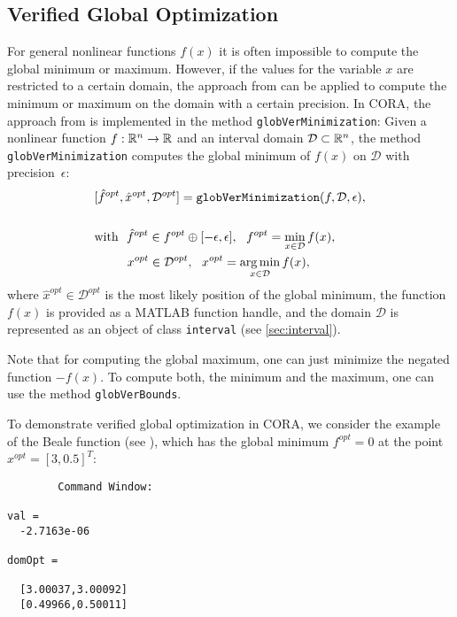\subsection{Verified Global Optimization}

For general nonlinear functions $f(x)$ it is often impossible to compute the global minimum or maximum. However, if the values for the variable $x$ are restricted to a certain domain, the approach from \cite{Makino2005} can be applied to compute the minimum or maximum on the domain with a certain precision. In CORA, the approach from \cite{Makino2005} is implemented in the method \texttt{globVerMinimization}: Given a nonlinear function $f: \mathbb{R}^n \to \mathbb{R}$ and an interval domain $\mathcal{D} \subset \mathbb{R}^n$, the method \texttt{globVerMinimization} computes the global minimum of $f(x)$ on $\mathcal{D}$ with precision~$\epsilon$:
\begin{align*}
	\begin{split}
	& [\hat{f}^{opt},\hat{x}^{opt},\mathcal{D}^{opt}] = \texttt{globVerMinimization}(f,\mathcal{D},\epsilon), \\
	& ~ \\
	& \text{with} ~~ \hat{f}^{opt} \in f^{opt} \oplus [-\epsilon,\epsilon], ~~f^{opt} =  \min_{x \in \mathcal{D}} f(x), \\
	& ~~~~~~~~ x^{opt} \in \mathcal{D}^{opt}, ~~ x^{opt} = \operatorname*{arg\,min}_{x \in \mathcal{D}} f(x),
	\end{split}
\end{align*}
where $\hat{x}^{opt} \in \mathcal{D}^{opt}$ is the most likely position of the global minimum, the function $f(x)$ is provided as a MATLAB function handle, and the domain $\mathcal{D}$ is represented as an object of class \texttt{interval} (see \cref{sec:interval}).

Note that for computing the global maximum, one can just minimize the negated function $-f(x)$. To compute both, the minimum and the maximum, one can use the method \texttt{globVerBounds}.

To demonstrate verified global optimization in CORA, we consider the example of the Beale function (see \cite[Sec.~6]{Makino2005}), which has the global minimum $f^{opt} = 0$ at the point $x^{opt} = [3,0.5]^T$:

\begin{center}
\begin{minipage}[t]{0.65\textwidth}
	\vspace{10pt}
	\footnotesize
	
\end{minipage}
\begin{minipage}[t]{0.3\textwidth}
	\vspace{10pt}
	\begin{verbatim}
		Command Window:	
	
val =
  -2.7163e-06
  
domOpt =

  [3.00037,3.00092]
  [0.49966,0.50011]
  
  
	\end{verbatim}
\end{minipage}
\end{center}
